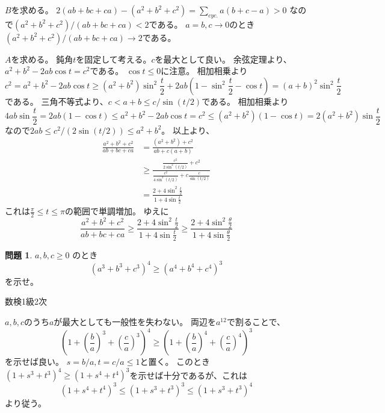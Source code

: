 \documentclass[uplatex, a5paper]{jsarticle}
\makeatletter
\theoremstyle{definition}
\newtheorem{prob}{問題}
\renewenvironment{proof}[1][\proofname]{
  \pushQED{\qed}%
  \normalfont \topsep6\p@\@plus6\p@\relax
  \trivlist
  \item[\hskip\labelsep
    #1\@addpunct{\textbf{.}}]\ignorespaces
}{%
  \popQED\endtrivlist\@endpefalse
}
\providecommand{\proofname}{証明}
\def\qed{\hfill $\Box$}
\makeatother
\begin{document}
\begin{proof}
  \(B\)を求める。
  \(2(ab+bc+ca) - (a^2+b^2+c^2) = \sum_{cyc.} a(b+c-a) > 0\)
  なので\((a^2+b^2+c^2)/(ab+bc+ca) < 2\)である。
  \(a=b , c \to 0\)のとき\((a^2+b^2+c^2)/(ab+bc+ca) \to 2\)である。

  \(A\)を求める。
  鈍角\(t\)を固定して考える。\(c\)を最大として良い。
  余弦定理より、\(a^2+b^2 -2ab \cos t = c^2\)である。
  \(\cos t \leq 0\)に注意。
  相加相乗より
  \[
  c^2 = a^2+b^2 -2ab \cos t
  \geq ( a^2 + b^2 ) \sin ^2 \frac{ t }{2}
  + 2ab \left( 1 - \sin ^2 \frac{ t }{2} - \cos t \right)
  = ( a + b )^2 \sin ^2 \frac{ t }{2}
  \]
  である。
  三角不等式より、\(c < a+b \leq c/ \sin ( t /2 )\)である。
  相加相乗より
  \[
  4ab \sin \frac{ t }{2}
  = 2ab( 1 - \cos t ) \leq a^2+b^2 - 2ab\cos t
  = c^2 \leq ( a^2+b^2 )( 1-\cos t )
  = 2(a^2+b^2)\sin \frac{ t }{2}
  \]
  なので\(2ab \leq c^2/ ( 2\sin ( t /2 ) ) \leq a^2 + b^2\)。
  以上より、
  \begin{align*}
    \frac{a^2+b^2+c^2}{ab+bc+ca} &= \frac{(a^2+b^2)+c^2}{ab+c(a+b)} \\
    &\geq \frac{\frac{c^2}{2\sin ^2 (t/2)}+c^2}{\frac{c^2}{4\sin ^2(t/2) } + c\frac{c}{\sin (t/2) }} \\
    &= \frac{ 2 + 4\sin ^2 \frac{ t }{2} }{ 1 + 4 \sin \frac{ t }{2} }
  \end{align*}
  これは\(\frac{\pi }{2} \leq t \leq \pi\)の範囲で単調増加。
  ゆえに
  \[
  \frac{a^2+b^2+c^2}{ab+bc+ca}
  \geq \frac{ 2 + 4\sin ^2 \frac{ t }{2} }{ 1 + 4 \sin \frac{ t }{2} }
  \geq \frac{ 2 + 4\sin ^2 \frac{ \theta }{2} }{ 1 + 4 \sin \frac{ \theta }{2} }
  \]
\end{proof}










\newpage


\begin{prob}
  \(a , b , c \geq 0\)
  のとき
  \[
  (a^3+b^3+c^3)^4 \geq (a^4+b^4+c^4)^3
  \]
  を示せ。
  \begin{flushright}
    数検1級2次
  \end{flushright}
\end{prob}


\begin{proof}
  \(a,b,c\)のうち\(a\)が最大としても一般性を失わない。
  両辺を\(a^{12}\)で割ることで、
  \[
  \left( 1+ \left( \frac{b}{a} \right) ^3 + \left( \frac{c}{a} \right) ^3 \right) ^4
  \geq \left( 1 + \left( \frac{b}{a} \right) ^4 + \left( \frac{c}{a} \right) ^4 \right) ^3
  \]
  を示せば良い。
  \(s=b/a , t=c/a \leq 1\)と置く。
  このとき\((1+s^3+t^3)^4 \geq ( 1+s^4+t^4 )^3\)を示せば十分であるが、これは
  \[
  ( 1+s^4+t^4 )^3 \leq ( 1+s^3+t^3 )^3 \leq (1+s^3+t^3)^4
  \]
  より従う。
\end{proof}
\end{document}
